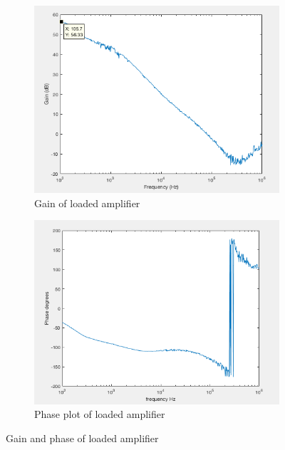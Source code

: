 		
		\begin{figure}[H]
			\centering
			\begin{subfigure}[b]{0.45\textwidth}
				\centering
				\includegraphics[scale=.40]{ExperimentalImplementation/gainwithload.png}
				\caption{Gain of loaded amplifier}
				\label{fig:gainwithload}
			\end{subfigure}
			\hfill
			\begin{subfigure}[b]{0.45\textwidth}
				\centering
				\includegraphics[scale=.40]{ExperimentalImplementation/phasewithload.png}
				\caption{Phase plot of loaded amplifier}
				\label{fig:phasewithload}
			\end{subfigure}
			\caption{Gain and phase of loaded amplifier}
			\label{fig:loadamp}
		\end{figure} 
	

